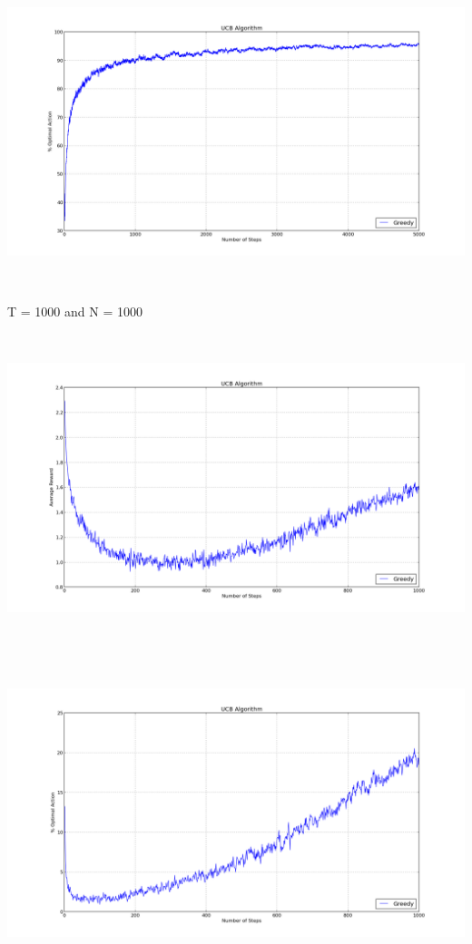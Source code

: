 \documentclass[a4paper,10pt]{report}
\newenvironment{my_itemize}{
\begin{itemize}
  \setlength{\itemsep}{1pt}
  \setlength{\parskip}{0pt}
  \setlength{\parsep}{0pt}}{
\end{itemize}}
\begin{document}
\begin{my_itemize}
\begin{center}
\end{center}
\begin{center}
\centerline{\includegraphics*[width=180mm, height=90mm]{UCBOpt-10-5000.png}}
\end{center}
\pagebreak
\item T = 1000 and N = 1000
\begin{center}
\centerline{\includegraphics*[width=180mm, height=90mm]{UCBRew-1000-1000.png}}
\end{center}
\begin{center}
\centerline{\includegraphics*[width=180mm, height=90mm]{UCBOpt-1000-1000.png}}
\end{center}
\end{my_itemize}
\end{document}
